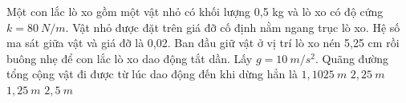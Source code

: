 \begin{ex}%
Một con lắc lò xo gồm một vật nhỏ có khối lượng 0,5 kg và lò xo có độ cứng $k=80\ N/m.$ Vật nhỏ được đặt trên giá đỡ cố định nằm ngang trục lò xo. Hệ số ma sát giữa vật và giá đỡ là 0,02. Ban đầu giữ vật ở vị trí lò xo nén 5,25 cm rồi buông nhẹ để con lắc lò xo dao động tắt dần. Lấy $g=10\ m/s^2$. Quãng đường tổng cộng vật đi được từ lúc dao động đến khi dừng hẳn là
\choice
{\True $1,1025\ m$}
{$2,25\ m$}
{$1,25\ m$}
{$2,5\ m$}
\end{ex} 

